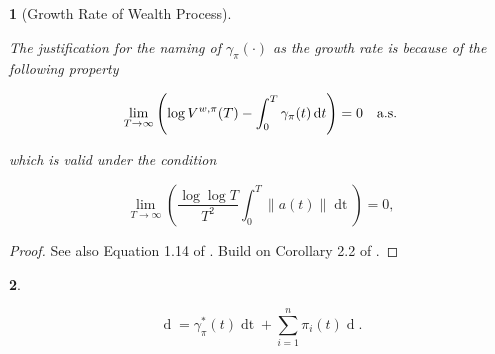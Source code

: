 \documentclass[british]{amsart} \usepackage{lmodern}
\numberwithin{equation}{section} \numberwithin{figure}{section}
\theoremstyle{plain} \newtheorem{thm}{\protect\theoremname}[section]
\theoremstyle{definition} \newtheorem{defn}[thm]{\protect\definitionname}
\theoremstyle{plain} \newtheorem{assumption}[thm]{\protect\assumptionname}
\theoremstyle{plain} \newtheorem{lem}[thm]{\protect\lemmaname}
\theoremstyle{plain} \newtheorem{prop}[thm]{\protect\propositionname}
\theoremstyle{remark} \newtheorem{rem}[thm]{\protect\remarkname}
\theoremstyle{plain} \newtheorem{cor}[thm]{\protect\corollaryname}
\renewcommand{\d}[1]{\mathop{\mathrm{d}{#1}}}
\newcommand{\norm}[1]{\left\lVert#1\right\rVert}
\begin{document}
\begin{prop} [Growth Rate of Wealth Process]
  \label{thm:wealthgrowthrate}

  The justification for the naming of $\gamma_{\pi}(\cdot)$ as the \textit{growth rate} is because of the following property

  \begin{equation*}
    \lim_{T \to \infty} 
      \left( 
      \log{V^{w,\pi}(T)} - \int_{0}^{T} \gamma_{\pi}(t)\d{t} 
      \right) = 0
    \quad \almostsurely
  \end{equation*}

  which is valid under the condition

  \begin{equation*}
    \lim_{T \to \infty}
      \left(
        \frac{\log \log T}{T^2} \int_{0}^{T} \norm{ a(t) } \d{t}
      \right) = 0,
  \end{equation*}

\end{prop}

\begin{proof}
  See also Equation 1.14 of \cite{fernholz2009}.
  Build on Corollary 2.2 of \cite{fernholz1999pgf}.

\end{proof}

\begin{prop}
  \label{prop:dlogV}

  \begin{equation}
      \d{\log V^{\pi}(t)} = \gamma_{\pi}^{*}(t)\d{t} + \sum_{i=1}^{n} \pi_{i}(t) \d{\log{X_{i}(t)}}.
  \end{equation}

\end{prop}
\end{document}
